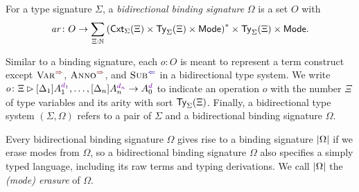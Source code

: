 \begin{definition}
  For a type signature $\Sigma$, a \emph{bidirectional binding signature} $\Omega$ is a set $O$ with
  \[
    \mathit{ar}\colon O \to \sum_{\Xi : \mathbb{N}} \left(\mathsf{Cxt}_{\Sigma}(\Xi) \times \mathsf{Ty}_{\Sigma}(\Xi) \times {\mathsf{Mode}}\right)^* \times \mathsf{Ty}_{\Sigma}(\Xi) \times {\mathsf{Mode}}.
  \]
\end{definition}
Similar to a binding signature, each $o:O$ is meant to represent a term construct except $\SynRule{Var}$, $\SynRule{Anno}$, and $\ChkRule{Sub}$ in a bidirectional type system.
We write $\aritysymbol{o}{\Xi}{[\Delta_1]A_{1}^{\dir{d_1}}, \ldots, [\Delta_{n}] A^{\dir{d_n}}_{n}}{A_0^{\dir{d}}}$ to indicate an operation $o$ with the number $\Xi$ of type variables and its arity with sort $\mathsf{Ty}_{\Sigma}(\Xi)$.
Finally, a bidirectional type system $(\Sigma, \Omega)$ refers to a pair of $\Sigma$ and a bidirectional binding signature $\Omega$.

Every bidirectional binding signature $\Omega$ gives rise to a binding signature $\left|\Omega\right|$ if we erase modes from $\Omega$, so a bidirectional binding signature $\Omega$ also specifies a simply typed language, including its raw terms and typing derivations.
We call $\left|\Omega\right|$ the \emph{(mode) erasure} of $\Omega$.

